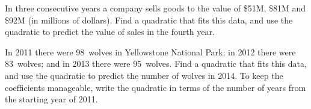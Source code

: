 \begin{exercise}  
In three consecutive years a company sells goods to the value of \$51M, \$81M and \$92M (in millions of dollars).
Find a quadratic that fits this data, and use the quadratic to predict the value of sales in the fourth year.
\end{exercise}




\begin{exercise}  
In 2011 there were 98~wolves in Yellowstone National Park; in 2012 there were 83~wolves; and in 2013 there were 95~wolves.
Find a quadratic that fits this data, and use the quadratic to predict the number of wolves in 2014.
To keep the coefficients manageable, write the quadratic in terms of the number of years from the starting year of 2011.
\end{exercise}








